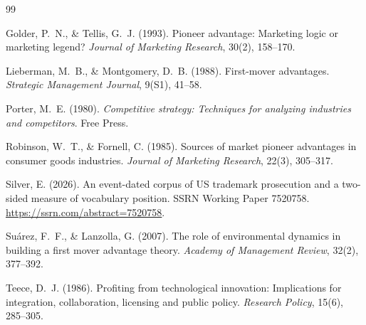\begin{thebibliography}{99}

Golder, P.~N., \& Tellis, G.~J. (1993). Pioneer advantage: Marketing logic or
marketing legend? \emph{Journal of Marketing Research}, 30(2), 158--170.

Lieberman, M.~B., \& Montgomery, D.~B. (1988). First-mover advantages.
\emph{Strategic Management Journal}, 9(S1), 41--58.

Porter, M.~E. (1980). \emph{Competitive strategy: Techniques for analyzing industries and
competitors}. Free Press.

Robinson, W.~T., \& Fornell, C. (1985). Sources of market pioneer advantages
in consumer goods industries. \emph{Journal of Marketing Research}, 22(3),
305--317.

Silver, E. (2026). An event-dated corpus of US trademark prosecution and
a two-sided measure of vocabulary position. SSRN Working Paper 7520758.
\url{https://ssrn.com/abstract=7520758}.

Su\'arez, F.~F., \& Lanzolla, G. (2007). The role of environmental
dynamics in building a first mover advantage theory. \emph{Academy of
Management Review}, 32(2), 377--392.

Teece, D.~J. (1986). Profiting from technological innovation:
Implications for integration, collaboration, licensing and public
policy. \emph{Research Policy}, 15(6), 285--305.

\end{thebibliography}
